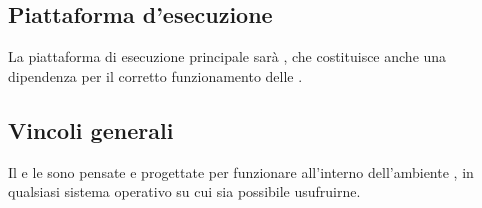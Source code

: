 \subsection{Piattaforma d'esecuzione}
La piattaforma di esecuzione principale sarà , che costituisce anche una dipendenza per il corretto funzionamento delle .

\subsection{Vincoli generali}
Il  e le  sono pensate e progettate per funzionare all'interno dell'ambiente , in qualsiasi sistema operativo su cui sia possibile usufruirne.


